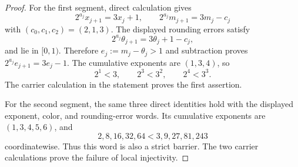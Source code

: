 \documentclass[11pt]{article}
\begin{document}
\begin{proof}
For the first segment, direct calculation gives
\[
  2^{a_j}x_{j+1}=3x_j+1,
  \qquad
  2^{a_j}m_{j+1}=3m_j-c_j
\]
with $(c_0,c_1,c_2)=(2,1,3)$.  The displayed rounding errors satisfy
\[
  2^{a_j}\theta_{j+1}=3\theta_j+1-c_j,
\]
and lie in $[0,1)$.  Therefore $e_j:=m_j-\theta_j>1$ and subtraction proves
$2^{a_j}e_{j+1}=3e_j-1$.  The cumulative exponents are $(1,3,4)$, so
\[
  2^1<3,
  \qquad
  2^3<3^2,
  \qquad
  2^4<3^3.
\]
The carrier calculation in the statement proves the first assertion.

For the second segment, the same three direct identities hold with the
displayed exponent, color, and rounding-error words.  Its cumulative
exponents are $(1,3,4,5,6)$, and
\[
  2,8,16,32,64<3,9,27,81,243
\]
coordinatewise.  Thus this word is also a strict barrier.  The two carrier
calculations prove the failure of local injectivity.
\end{proof}
\end{document}
